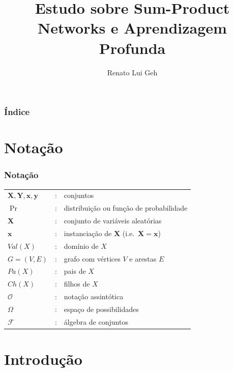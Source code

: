 \documentclass[10pt]{beamer}
\title{Estudo sobre Sum-Product Networks e Aprendizagem Profunda}
\author{Renato Lui Geh}
\institute[IME-USP] {%
  Instituto de Matemática e Estatística\\
  Universidade de São Paulo
}
\theoremstyle{plain}
\newcommand{\set}[1]{\mathbf{#1}}
\newcommand{\bigo}{\mathcal{O}}
\begin{document}
\frame{\titlepage}

\begin{frame}
  \frametitle{Índice}
  \tableofcontents
\end{frame}


\section{Notação}

\begin{frame}
  \frametitle{Notação}
  \begin{tabular}{l@{}l@{}p{3in}}
    $\set{X,Y,x,y}$\hspace*{0.6cm}&:\hspace*{0.2cm}& conjuntos\pause\\
    $\Pr$&: & distribuição ou função de probabilidade\pause\\
    $\set{X}$&: & conjunto de variáveis aleatórias\pause\\
    $\set{x}$&: & instanciação de $\set{X}$ (i.e.\ $\set{X}=\set{x}$)\pause\\
    $Val(X)$&: & domínio de $X$\pause\\
    $G=(V,E)$&: & grafo com vértices $V$ e arestas $E$\pause\\
    $Pa(X)$&: & pais de $X$\pause\\
    $Ch(X)$&: &filhos de $X$\pause\\
    $\bigo$&: & notação assintótica\pause\\
    $\Omega$&: & espaço de possibilidades\pause\\
    $\mathcal{F}$&: & álgebra de conjuntos\\
  \end{tabular}
\end{frame}


\section{Introdução}
\end{document}
